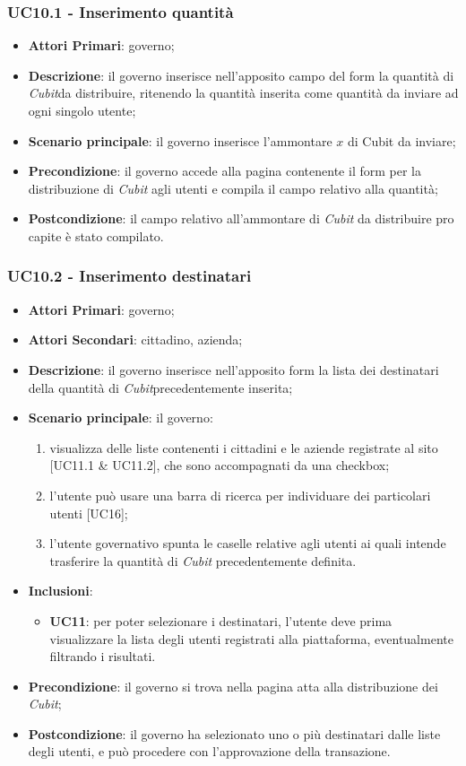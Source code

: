 \subsubsection{UC10.1 - Inserimento quantità}
\begin{itemize}
	\item \textbf{Attori Primari}: governo;
	\item \textbf{Descrizione}: il governo inserisce nell'apposito campo del form la quantità di \textit{Cubit}\glosp da distribuire, ritenendo la quantità inserita come quantità da inviare ad ogni singolo utente;
	\item \textbf{Scenario principale}: il governo inserisce l'ammontare $x$ di 
	Cubit da inviare;
	\item \textbf{Precondizione}: il governo accede alla pagina contenente il form per la distribuzione di \textit{Cubit} agli utenti e compila il campo relativo alla quantità;
	\item \textbf{Postcondizione}: il campo relativo all'ammontare di \textit{Cubit} da 
	distribuire pro capite è stato compilato. 
\end{itemize}
\subsubsection{UC10.2 - Inserimento destinatari}
\begin{itemize}
	\item \textbf{Attori Primari}: governo;
	\item \textbf{Attori Secondari}: cittadino, azienda;
	\item \textbf{Descrizione}: il governo inserisce nell'apposito form la lista dei destinatari della quantità di \textit{Cubit}\glosp precedentemente inserita;
	\item \textbf{Scenario principale}: il governo:
	\begin{enumerate}[label=\alph*.]
		\item visualizza delle liste contenenti i cittadini e le aziende registrate al sito [UC11.1 \& UC11.2], che sono accompagnati da una checkbox;
		\item l'utente può usare una barra di ricerca per individuare dei particolari utenti [UC16];
		\item l'utente governativo spunta le caselle relative agli utenti ai quali intende trasferire la quantità di \textit{Cubit} precedentemente definita.
	\end{enumerate}
	\item \textbf{Inclusioni}:
	\begin{itemize}
		\item \textbf{UC11}: per poter selezionare i destinatari, l'utente deve prima visualizzare la lista degli utenti registrati alla piattaforma, eventualmente filtrando i risultati.
	\end{itemize}
	\item \textbf{Precondizione}: il governo si trova nella pagina atta alla distribuzione dei \textit{Cubit};
	\item \textbf{Postcondizione}: il governo ha selezionato uno o più destinatari dalle liste degli utenti, e può procedere con l'approvazione della transazione.
\end{itemize}
